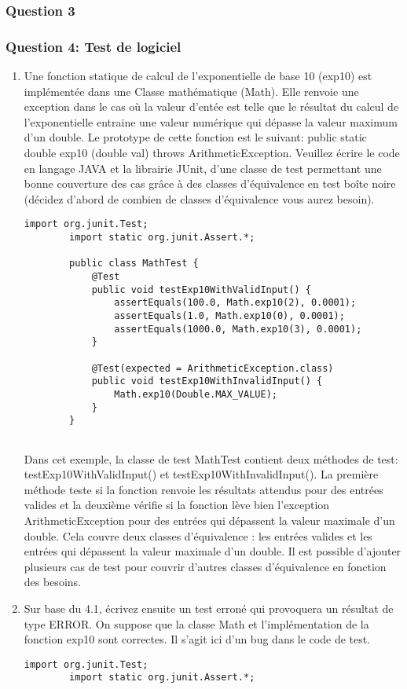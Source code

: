 \subsubsection{Question 3}
\subsubsection{Question 4: Test de logiciel}
\begin{enumerate}
	\item Une fonction statique de calcul de l'exponentielle de base 10 (exp10) est implémentée dans une Classe mathématique (Math). Elle renvoie une exception dans le cas où la valeur d'entée est telle que le résultat du calcul de l'exponentielle entraine une valeur numérique qui dépasse la valeur maximum d'un double. Le prototype de cette fonction est le suivant:
	public static double exp10 (double val) throws
	ArithmeticException.
	Veuillez écrire le code en langage JAVA et la librairie JUnit, d'une classe de test permettant une bonne couverture des cas grâce à des classes d'équivalence en test boîte noire (décidez d'abord de combien de classes d'équivalence vous aurez besoin).
	\begin{lstlisting}[style=monstyle]
		import org.junit.Test;
		import static org.junit.Assert.*;
		
		public class MathTest {
			@Test
			public void testExp10WithValidInput() {
				assertEquals(100.0, Math.exp10(2), 0.0001);
				assertEquals(1.0, Math.exp10(0), 0.0001);
				assertEquals(1000.0, Math.exp10(3), 0.0001);
			}
			
			@Test(expected = ArithmeticException.class)
			public void testExp10WithInvalidInput() {
				Math.exp10(Double.MAX_VALUE);
			}
		}
		
	\end{lstlisting}
Dans cet exemple, la classe de test MathTest contient deux méthodes de test: testExp10WithValidInput() et testExp10WithInvalidInput(). La première méthode teste si la fonction renvoie les résultats attendus pour des entrées valides et la deuxième vérifie si la fonction lève bien l'exception ArithmeticException pour des entrées qui dépassent la valeur maximale d'un double. Cela couvre deux classes d'équivalence : les entrées valides et les entrées qui dépassent la valeur maximale d'un double.
Il est possible d'ajouter plusieurs cas de test pour couvrir d'autres classes d'équivalence en fonction des besoins.

	\item Sur base du 4.1, écrivez ensuite un test erroné qui provoquera un résultat de type ERROR. On suppose que la classe Math et l'implémentation de la fonction exp10 sont correctes. Il s'agit ici d'un bug dans le code de test.
	\begin{lstlisting}[style=monstyle]
		import org.junit.Test;
		import static org.junit.Assert.*;
		

\end{lstlisting}
\end{enumerate}
